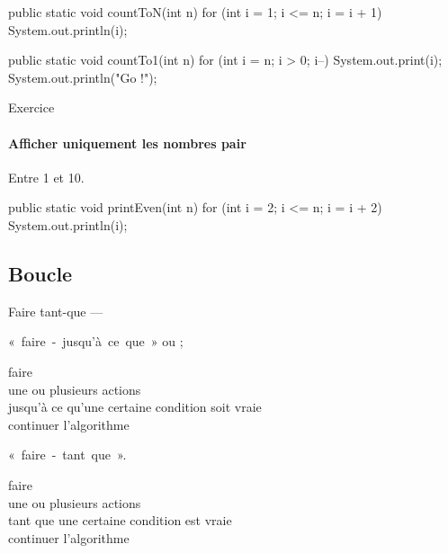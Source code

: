 \begin{hideedit}
\begin{frame}[fragile]
    \begin{java}
public static void countToN(int n) {
    for (int i = 1; i <= n; i = i + 1) {
        System.out.println(i);
    }
}
    \end{java}
\end{frame}

\begin{frame}[fragile]
\begin{java}
public static void countTo1(int n) {
    for (int i = n; i > 0; i--) {
        System.out.print(i);
    }
    System.out.println("Go !");
}
\end{java}
\end{frame}

\begin{frame}[fragile]{Exercice}
  \framesubtitle{Afficher uniquement les nombres pair}
  Entre 1 et 10.

  \pause
  \begin{java}
public static void printEven(int n) {
    for (int i = 2; i <= n; i = i + 2) {
        System.out.println(i);
    }
}
  \end{java}
\end{frame}

\subsection{Boucle }
\begin{frame}{\og Faire tant-que \og --- }

  «~faire~-~jusqu'à~ce~que~» ou ;
  \begin{langagenaturel}
    faire\\
      \tab une ou plusieurs actions\\
    jusqu'à ce qu'une certaine condition soit vraie\\
    continuer l'algorithme
  \end{langagenaturel}

  «~faire~-~tant~que~».
  \begin{langagenaturel}
    faire\\
      \tab une ou plusieurs actions\\
    tant que une certaine condition est vraie\\
    continuer l'algorithme
  \end{langagenaturel}
\end{frame}


\end{hideedit}
